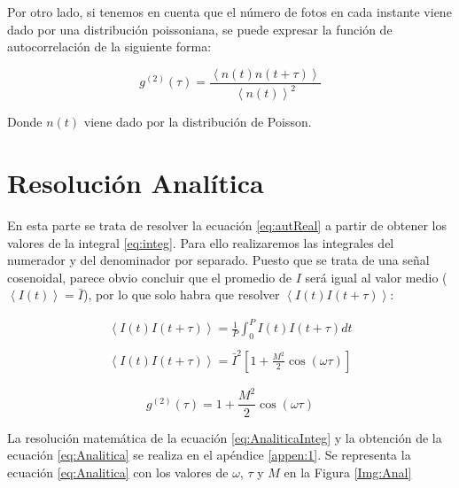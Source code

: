\documentclass[twoside]{article}
\begin{document}
\begin{multicols}{2}
			Por otro lado, si tenemos en cuenta que el número de fotos en cada instante viene dado por una distribución poissoniana, se puede expresar la función de autocorrelación de la siguiente forma:

				\begin{equation}
					g^{(2)}(\tau) = \frac{\left< n(t)n(t+\tau)\right>}{\left< n(t)\right>^2}
					\label{eq:autPoiss}
				\end{equation}

			Donde $n(t)$ viene dado por la distribución de Poisson.

		\section{Resolución Analítica}

			En esta parte se trata de resolver la ecuación \ref{eq:autReal} a partir de obtener los valores de la integral \ref{eq:integ}. Para ello realizaremos las integrales del numerador y del denominador por separado. Puesto que se trata de una señal cosenoidal, parece obvio concluir que el promedio de $I$ será igual al valor medio ($\left< I(t)\right> = \bar{I}$), por lo que solo habra que resolver $\left< I(t)I(t+\tau)\right>$:

				\begin{equation}
				\begin{matrix}
					\left< I(t)I(t+\tau)\right> = \frac{1}{P} \int^{P}_0 I(t)I(t+\tau) dt \\ \\
					\left< I(t)I(t+\tau)\right> =  \bar{I}^2 \left[1 + \frac{M^2}{2}\cos(\omega\tau)\right]
				\end{matrix}
				\label{eq:AnaliticaInteg}
				\end{equation}

				\begin{equation}
					g^{(2)}(\tau) = 1 + \frac{M^2}{2}\cos(\omega\tau)
					\label{eq:Analitica}
				\end{equation}

			La resolución matemática de la ecuación \ref{eq:AnaliticaInteg} y la obtención de la ecuación \ref{eq:Analitica} se realiza en el apéndice \ref{appen:1}. Se representa la ecuación \ref{eq:Analitica} con los valores de $\omega$, $\tau$ y $M$ en la Figura \ref{Img:Anal}


\end{multicols}
\end{document}
